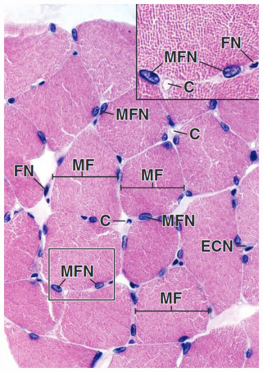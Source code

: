 \begin{itemize}
\begin{center}
    \includegraphics[scale=0.25]{images/week-1-rp5.png}

\end{center}
\end{itemize}
